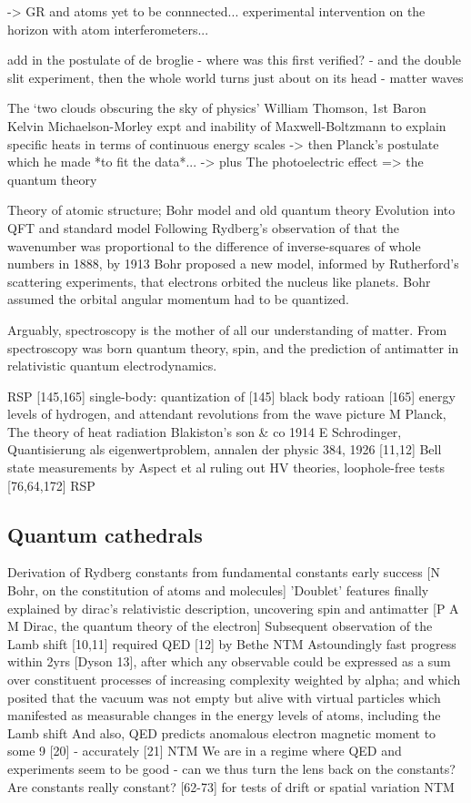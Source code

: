 	-> GR and atoms yet to be connnected... experimental intervention on the horizon with atom interferometers...

	add in the postulate of de broglie - where was this first verified? -
	and the double slit experiment, then the whole world turns just about on
	its head - matter waves

	The `two clouds obscuring the sky of physics' William Thomson, 1st Baron Kelvin
	 Michaelson-Morley expt and inability of Maxwell-Boltzmann to explain specific heats in terms of continuous energy scales
	 -> then Planck's postulate which he made *to fit the data*...
	 -> plus The photoelectric effect => the quantum theory

	Theory of atomic structure; Bohr model and old quantum theory
	Evolution into QFT and standard model
	Following Rydberg's observation of that the wavenumber was proportional to the difference of inverse-squares of whole numbers in 1888, by 1913 Bohr proposed a new model, informed by Rutherford's scattering experiments, that electrons orbited the nucleus like planets.
			Bohr assumed the orbital angular momentum had to be quantized.

	Arguably, spectroscopy is the mother of all our understanding of matter. From spectroscopy was born quantum theory, spin, and the prediction of antimatter in relativistic quantum electrodynamics.


	RSP [145,165] single-body: quantization of [145] black body ratioan [165] energy levels of hydrogen, and attendant revolutions from the wave picture  
	M Planck, The theory of heat radiation Blakiston's son \& co 1914
	E Schrodinger, Quantisierung als eigenwertproblem, annalen der physic 384, 1926
	[11,12] Bell state measurements by Aspect et al ruling out HV theories, loophole-free tests [76,64,172] RSP
	
\subsection*{Quantum cathedrals}

	Derivation of Rydberg constants from fundamental constants early success [N Bohr, on the constitution of atoms and molecules] 
	'Doublet' features finally explained by dirac's relativistic description, uncovering spin and antimatter [P A M Dirac, the quantum theory of the electron]
	Subsequent observation of the Lamb shift [10,11] required QED [12] by Bethe  NTM
	Astoundingly fast progress within 2yrs [Dyson 13], after which any observable could be expressed as a sum over constituent processes of increasing complexity weighted by alpha; and which posited that the vacuum was not empty but alive with virtual particles which manifested as measurable changes in the energy levels of atoms, including the Lamb shift
	And also, QED predicts anomalous electron magnetic moment to some 9 [20] - accurately [21] NTM
	We are in a regime where QED and experiments seem to be good - can we thus turn the lens back on the constants?	
	Are constants really constant? [62-73] for tests of drift or spatial variation  NTM

